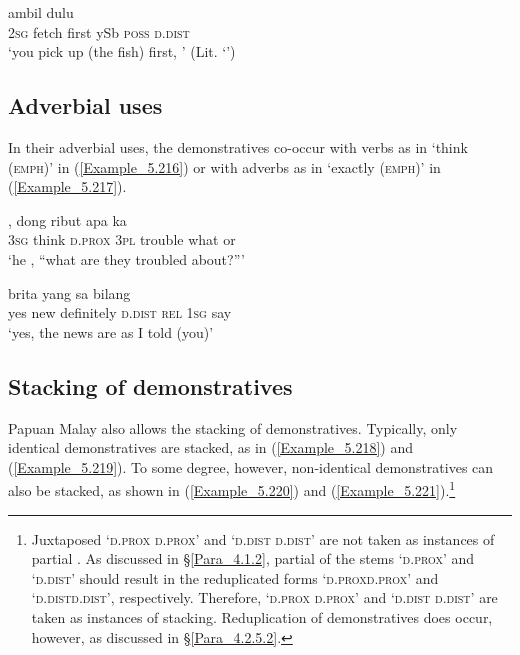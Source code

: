 \ea
\label{Example_5.215}
 {ambil} {dulu} {} {} {}\\ %
 \textsc{2sg}  fetch  first  ySb  \textsc{poss}  \textsc{d.dist}\\
\glt
‘you pick up (the fish) first, ’ (Lit. ‘’) \textstyleExampleSource{[081006-019-Cv.0002]}
\z


\subsection{Adverbial uses}
\label{Para_5.6.3}
In their adverbial uses, the demonstratives co-occur with verbs as in  ‘think (\textsc{emph})’ in (\ref{Example_5.216}) or with adverbs as in  ‘exactly (\textsc{emph})’ in (\ref{Example_5.217}).


\ea
\label{Example_5.216}
 {} {,} {dong} {ribut} {apa} {ka}\\ %
 \textsc{3sg}  think  \textsc{d.prox}  \textsc{3pl}  trouble  what  or\\
\glt 
‘he  \bluebold{(}\bluebold{)}, ``what are they troubled about?''' \textstyleExampleSource{[081014-005-Cv.0036]}
\z

\ea
\label{Example_5.217}
 {brita} {} {} {yang} {sa} {bilang}\\ %
 yes  new  definitely  \textsc{d.dist}  \textsc{rel}  \textsc{1sg}  say\\
\glt
‘yes, the news are  \bluebold{(}\bluebold{)} as I told (you)’ \textstyleExampleSource{[080922-001a-CvPh.0767]}
\z


\subsection{Stacking of demonstratives}
\label{Para_5.6.4}
Papuan Malay also allows the stacking of demonstratives. Typically, only identical demonstratives are stacked, as in (\ref{Example_5.218}) and (\ref{Example_5.219}). To some degree, however, non-identical demonstratives can also be stacked, as shown in (\ref{Example_5.220}) and (\ref{Example_5.221}).\footnote{Juxtaposed  ‘\textsc{d.prox d.prox}’ and  ‘\textsc{d.dist d.dist}’ are not taken as instances of partial . As discussed in §\ref{Para_4.1.2}, partial  of the stems  ‘\textsc{d.prox}’ and  ‘\textsc{d.dist}’ should result in the reduplicated forms  ‘\textsc{d.prox{\Tilde}d.prox}’ and  ‘\textsc{d.dist}{\Tilde}\textsc{d.dist}’, respectively. Therefore,  ‘\textsc{d.prox d.prox}’ and  ‘\textsc{d.dist} \textsc{d.dist}’ are taken as instances of  stacking. Reduplication of demonstratives does occur, however, as discussed in §\ref{Para_4.2.5.2}.}




